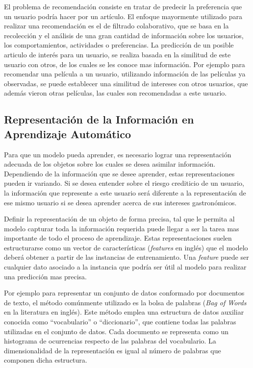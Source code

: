 \documentclass[a4paper,11pt,spanish]{book}
\begin{document}
	El problema de recomendación consiste en tratar de predecir la preferencia que un usuario podría hacer por un artículo. 
	El enfoque mayormente utilizado para realizar una recomendación es el de filtrado colaborativo, que se basa en la recolección y el análisis de una gran cantidad 
	de información sobre los usuarios, los comportamientos, actividades o preferencias. 
	La predicción de un posible articulo de interés para un usuario, se realiza basada en la similitud de este usuario con otros, de los cuales se les conoce 
	mas información. 
	Por ejemplo para recomendar una película a un usuario, utilizando información de las películas ya observadas, se puede
	establecer una similitud de intereses con otros usuarios, que además vieron otras películas, las cuales son recomendadas a este usuario.

    \subsection{Representación de la Información en Aprendizaje Automático} \label{sec:representacion}
      Para que un modelo pueda aprender, es necesario lograr una representación adecuada de los objetos sobre los cuales se desea asimilar información.
      Dependiendo de la información que se desee aprender, estas representaciones pueden ir variando. 
      Si se desea entender sobre el riesgo crediticio de un usuario, la información que represente a este usuario será diferente a la representación de ese mismo 
      usuario si se desea aprender acerca de sus intereses gastronómicos.

      Definir la representación de un objeto de forma precisa, tal que le permita al modelo capturar toda la información requerida puede llegar a ser la tarea mas importante de todo el 
      proceso de aprendizaje.
      Estas representaciones suelen estructurarse como un vector de características (\emph{features} en inglés) que el modelo deberá obtener a partir de las instancias 
      de entrenamiento.
      Una \emph{feature} puede ser cualquier dato asociado a la instancia que podría ser útil al modelo para realizar una predicción mas precisa.

      Por ejemplo para representar un conjunto de datos conformado por documentos de texto, el método comúnmente utilizado es la bolsa de palabras (\emph{Bag of Words} 
      en la literatura en inglés). 
      Este método emplea una estructura de datos auxiliar conocida como ``vocabulario'' o ``diccionario'', que contiene todas las palabras utilizadas en el conjunto de datos. 
      Cada documento se representa como un histograma de ocurrencias respecto de las palabras del vocabulario. 
      La dimensionalidad de la representación es igual al número de palabras que componen dicha estructura.
\end{document}
